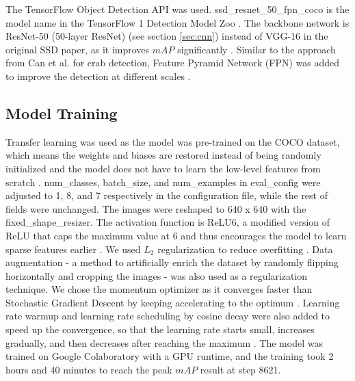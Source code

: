 \documentclass[a4paper, 11pt, oneside]{article}
\begin{document}
The TensorFlow Object Detection API \cite{huang2017speed, tfobjectdetection} was used. ssd\_resnet\_50\_fpn\_coco
is the model name in the TensorFlow 1 Detection Model Zoo \cite{tf1detectionmodelzoo}. The backbone network
is ResNet-50 (50-layer ResNet) (see section \ref{sec:cnn}) instead of VGG-16 in the original SSD paper, as it
improves $mAP$ significantly \cite{he2016deep}. Similar to the approach from Can et al. \cite{cao2020real} for crab
detection, Feature Pyramid Network (FPN) was added to improve the detection at different scales \cite{lin2017feature}.

\subsection{Model Training}

Transfer learning \cite{torrey2010transfer} was used as the model was pre-trained on the COCO dataset, which means the
weights and biases are restored instead of being randomly initialized and the model does not have to learn the low-level
features from scratch \cite{geron2019hands}. num\_classes, batch\_size, and num\_examples in eval\_config were adjusted
to 1, 8, and 7 respectively in the configuration file, while the rest of fields were unchanged. The images were reshaped
to 640 x 640 with the fixed\_shape\_resizer. The activation function is ReLU6, a modified version of ReLU that caps
the maximum value at 6 and thus encourages the model to learn sparse features earlier
\cite{krizhevsky2010convolutional}. We used $L_2$ regularization \cite{ng2004feature} to reduce overfitting
\cite{hawkins2004problem}. Data augmentation \cite{krizhevsky2012imagenet} - a method to artificially enrich the
dataset by randomly flipping horizontally and cropping the images - was also used as a regularization technique.
We chose the momentum optimizer \cite{polyak1964some} as it converges faster than Stochastic Gradient Descent
\cite{bottou2010large} by keeping accelerating to the optimum \cite{geron2019hands}. Learning rate warmup and learning
rate scheduling by cosine decay were also added to speed up the convergence, so that the learning rate starts small,
increases gradually, and then decreases after reaching the maximum
\cite{geron2019hands, goyal2017accurate, senior2013empirical, loshchilov2016sgdr}.
The model was trained on Google Colaboratory \cite{colab} with a GPU runtime, and the training took 2 hours and 40
minutes to reach the peak $mAP$ result at step 8621.
\end{document}
